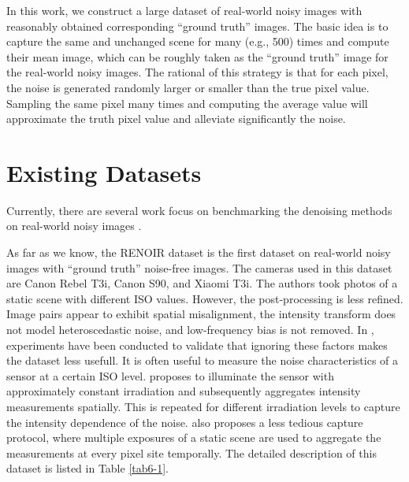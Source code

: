 In this work, we construct a large dataset of real-world noisy images with reasonably obtained corresponding ``ground truth'' images. The basic idea is to capture the same and unchanged scene for many (e.g., 500) times and compute their mean image, which can be roughly taken as the ``ground truth'' image for the real-world noisy images. The rational of this strategy is that for each pixel, the noise is generated randomly larger or smaller than the true pixel value. Sampling the same pixel many times and computing the average value will approximate the truth pixel value and alleviate significantly the noise.

\section{Existing Datasets}

Currently, there are several work focus on benchmarking the denoising methods on real-world noisy images \cite{RENOIR2014,crosschannel2016,dnd2017}.

As far as we know, the RENOIR dataset \cite{RENOIR2014} is the first dataset on real-world noisy images with ``ground truth'' noise-free images. The cameras used in this dataset are Canon Rebel T3i, Canon S90, and Xiaomi T3i. The authors took photos of a static scene with different ISO values. However, the post-processing is less refined. Image pairs appear to exhibit spatial misalignment, the intensity transform does not model heteroscedastic noise, and low-frequency bias is not removed. In \cite{RENOIR2014}, experiments have been conducted to validate that ignoring these factors makes the dataset less usefull. It is often useful to measure the noise characteristics of a sensor at a certain ISO level. \cite{RENOIR2014} proposes to illuminate the sensor with approximately constant irradiation and subsequently aggregates intensity measurements spatially. This is repeated for different irradiation levels to capture the intensity dependence of the noise. \cite{RENOIR2014} also proposes a less tedious capture protocol, where multiple exposures of a static scene are used to aggregate the measurements at every pixel site temporally. The detailed description of this dataset is listed in Table \ref{tab6-1}.

